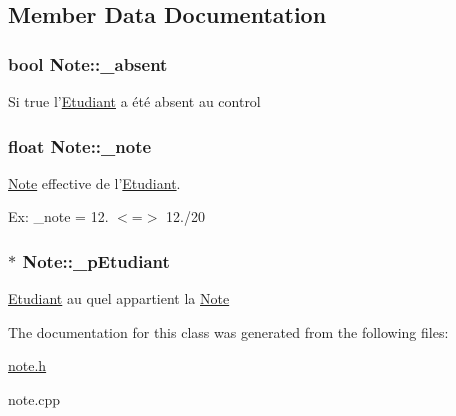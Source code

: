 \subsection{Member Data Documentation}
\hypertarget{class_note_a5d6599721a364a7486e3056b87eb0b25}{
\subsubsection[{\-\_\-absent}]{\setlength{\rightskip}{0pt plus 5cm}bool Note\-::\-\_\-absent\hspace{0.3cm}{\ttfamily [private]}}}\label{class_note_a5d6599721a364a7486e3056b87eb0b25}
Si true l'\hyperlink{class_etudiant}{Etudiant} a été absent au control \hypertarget{class_note_a2c1f6f0948a0d8e1cbfc9a2ce3271a8f}{
\subsubsection[{\-\_\-note}]{\setlength{\rightskip}{0pt plus 5cm}float Note\-::\-\_\-note\hspace{0.3cm}{\ttfamily [private]}}}\label{class_note_a2c1f6f0948a0d8e1cbfc9a2ce3271a8f}


\hyperlink{class_note}{Note} effective de l'\hyperlink{class_etudiant}{Etudiant}. 

Ex\-: \-\_\-note = 12. $<$=$>$ 12./20 \hypertarget{class_note_a664da26e6bfdfd67a40f7d4a97c9364c}{
\subsubsection[{\-\_\-p\-Etudiant}]{$\ast$ Note\-::\-\_\-p\-Etudiant\hspace{0.3cm}{\ttfamily [private]}}}\label{class_note_a664da26e6bfdfd67a40f7d4a97c9364c}
\hyperlink{class_etudiant}{Etudiant} au quel appartient la \hyperlink{class_note}{Note} 

The documentation for this class was generated from the following files\-:\begin{DoxyCompactItemize}
\item 
\hyperlink{note_8h}{note.\-h}\item 
note.\-cpp\end{DoxyCompactItemize}
